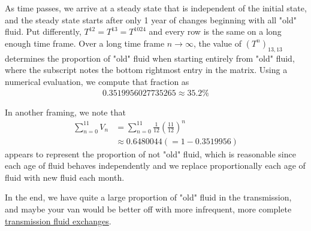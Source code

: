 \documentclass[reqno]{amsart}
\begin{document}
As time passes, we arrive at a steady state that is independent of the initial state, and the steady state starts after only 1 year of changes beginning with all "old" fluid. Put differently, $T^{12} = T^{13}=T^{1024}$ and every row is the same on a long enough time frame. Over a long time frame $n\rightarrow \infty$, the value of $\left(T^n\right)_{13, 13}$ determines the proportion of "old" fluid when starting entirely from "old" fluid, where the subscript notes the bottom rightmost entry in the matrix. 
Using a numerical evaluation, we compute that fraction as 
\begin{align*}
0.3519956027735265 \approx 35.2\%
\end{align*}

In another framing, we note that 
\begin{align*}
\sum_{n=0}^{11} V_n &= \sum_{n=0}^{11} \frac{1}{12}\left(\frac{11}{12}\right)^n \\
&\approx 0.6480044 \left(=1-0.3519956\right) 
\end{align*}
appears to represent the proportion of not "old" fluid, which is reasonable since each age of fluid behaves independently and we replace proportionally each age of fluid with new fluid each month. 

In the end, we have quite a large proportion of "old" fluid in the transmission, and maybe your van would be better off with more infrequent, more complete \href{https://fivethirtyeight.com/features/can-you-tune-up-the-truck/}{transmission fluid exchanges}. 
\end{document}
